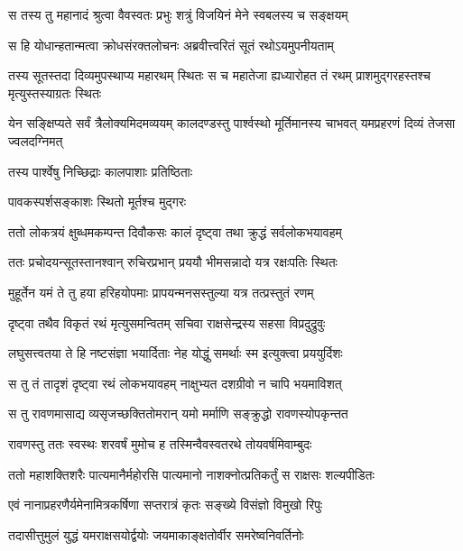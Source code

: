 
\twolineshloka
{स तस्य तु महानादं श्रुत्वा वैवस्वतः प्रभुः}
{शत्रुं विजयिनं मेने स्वबलस्य च सङ्क्षयम्} %

\twolineshloka
{स हि योधान्हतान्मत्वा क्रोधसंरक्तलोचनः}
{अब्रवीत्त्वरितं सूतं रथोऽयमुपनीयताम्} %

\threelineshloka
{तस्य सूतस्तदा दिव्यमुपस्थाप्य महारथम्}
{स्थितः स च महातेजा ह्यध्यारोहत तं रथम्}
{प्राशमुद्गरहस्तश्च मृत्युस्तस्याग्रतः स्थितः} %

\threelineshloka
{येन सङ्क्षिप्यते सर्वं त्रैलोक्यमिदमव्ययम्}
{कालदण्डस्तु पार्श्वस्थो मूर्तिमानस्य चाभवत्}
{यमप्रहरणं दिव्यं तेजसा ज्वलदग्निमत्} %

\onelineshloka
{तस्य पार्श्वेषु निच्छिद्राः कालपाशाः प्रतिष्ठिताः} %

\onelineshloka
{पावकस्पर्शसङ्काशः स्थितो मूर्तश्च मुद्गरः} %

\twolineshloka
{ततो लोकत्रयं क्षुब्धमकम्पन्त दिवौकसः}
{कालं दृष्ट्वा तथा क्रुद्धं सर्वलोकभयावहम्} %

\twolineshloka
{ततः प्रचोदयन्सूतस्तानश्वान् रुचिरप्रभान्}
{प्रययौ भीमसन्नादो यत्र रक्षःपतिः स्थितः} %

\twolineshloka
{मुहूर्तेन यमं ते तु हया हरिहयोपमाः}
{प्रापयन्मनसस्तुल्या यत्र तत्प्रस्तुतं रणम्} %

\twolineshloka
{दृष्ट्वा तथैव विकृतं रथं मृत्युसमन्वितम्}
{सचिवा राक्षसेन्द्रस्य सहसा विप्रदुद्रुवुः} %

\twolineshloka
{लघुसत्त्वतया ते हि नष्टसंज्ञा भयार्दिताः}
{नेह योद्धुं समर्थाः स्म इत्युक्त्वा प्रययुर्दिशः} %

\twolineshloka
{स तु तं तादृशं दृष्ट्वा रथं लोकभयावहम्}
{नाक्षुभ्यत दशग्रीवो न चापि भयमाविशत्} %

\twolineshloka
{स तु रावणमासाद्य व्यसृजच्छक्तितोमरान्}
{यमो मर्माणि सङ्क्रुद्धो रावणस्योपकृन्तत} %

\twolineshloka
{रावणस्तु ततः स्वस्थः शरवर्षं मुमोच ह}
{तस्मिन्वैवस्वतरथे तोयवर्षमिवाम्बुदः} %

\twolineshloka
{ततो महाशक्तिशरैः पात्यमानैर्महोरसि पात्यमानो}
{नाशक्नोत्प्रतिकर्तुं स राक्षसः शल्यपीडितः} %

\twolineshloka
{एवं नानाप्रहरणैर्यमेनामित्रकर्षिणा}
{सप्तरात्रं कृतः सङ्ख्ये विसंज्ञो विमुखो रिपुः} %

\twolineshloka
{तदासीत्तुमुलं युद्धं यमराक्षसयोर्द्वयोः}
{जयमाकाङ्क्षतोर्वीर समरेष्वनिवर्तिनोः} %

